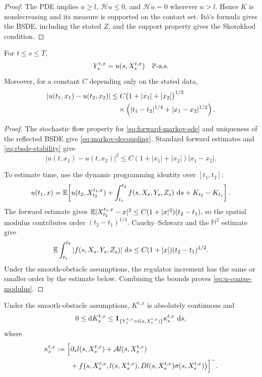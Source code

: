 \begin{proof}
The PDE implies $u\geq l$, $\mathcal H u\leq0$, and
$\mathcal H u=0$ wherever $u>l$. Hence $K$ is nondecreasing and its measure
is supported on the contact set. It\^o's formula gives the BSDE, including
the stated $Z$, and the support property gives the Skorokhod condition.
\end{proof}

\begin{theorem}
For $t\leq s\leq T$,
\begin{equation}
  Y_s^{t,x}=u(s,X_s^{t,x}) \quad\P\text{-a.s.} \label{eq:markov-decoupling}
\end{equation}
Moreover, for a constant $C$ depending only on the stated data,
\begin{align}
  |u(t_1,x_1)-u(t_2,x_2)|
  &\leq C\bigl(1+|x_1|+|x_2|\bigr)^{1/2} \notag\\
  &\quad\times
    \left(|t_1-t_2|^{1/4}+|x_1-x_2|^{1/2}\right). \label{eq:u-coarse-modulus}
\end{align}
\end{theorem}

\begin{proof}
The stochastic flow property for \eqref{eq:forward-markov-sde} and uniqueness
of the reflected BSDE give \eqref{eq:markov-decoupling}. Standard forward
estimates and \eqref{eq:rbsde-stability} give
\[
  |u(t,x_1)-u(t,x_2)|^2
  \leq C(1+|x_1|+|x_2|)|x_1-x_2|.
\]

To estimate time, use the dynamic programming identity over
$[t_1,t_2]$:
\begin{align*}
  u(t_1,x)
  =\E\!\left[
    u(t_2,X_{t_2}^{t_1,x})
    +\int_{t_1}^{t_2}f(s,X_s,Y_s,Z_s)\,\dd s
    +K_{t_2}-K_{t_1}
  \right].
\end{align*}
The forward estimate gives
$\E|X_{t_2}^{t_1,x}-x|^2\leq C(1+|x|^2)(t_2-t_1)$, so the spatial modulus contributes order $(t_2-t_1)^{1/4}$. Cauchy--Schwarz and the $\mathbb{H}^2$ estimate give
\[
  \E\int_{t_1}^{t_2}|f(s,X_s,Y_s,Z_s)|\,\dd s
  \leq C(1+|x|)(t_2-t_1)^{1/2}.
\]
Under the smooth-obstacle assumptions, the regulator increment has the same
or smaller order by the estimate below. Combining the bounds proves
\eqref{eq:u-coarse-modulus}.
\end{proof}

\begin{proposition}
Under the smooth-obstacle assumptions, $K^{t,x}$ is absolutely continuous
and
\begin{equation}
  0\leq\dd K_s^{t,x}
  \leq\1_{\{Y_s^{t,x}=l(s,X_s^{t,x})\}}
      \kappa_s^{t,x}\,\dd s, \label{eq:lewy-stampacchia}
\end{equation}
where
\begin{align*}
  \kappa_s^{t,x}
  :=\Bigl[
    &\partial_s l(s,X_s^{t,x})
     +\mathcal A l(s,X_s^{t,x})\\
    &+f\bigl(
       s,X_s^{t,x},l(s,X_s^{t,x}),
       Dl(s,X_s^{t,x})\sigma(s,X_s^{t,x})
      \bigr)
  \Bigr]^-.
\end{align*}
\end{proposition}

